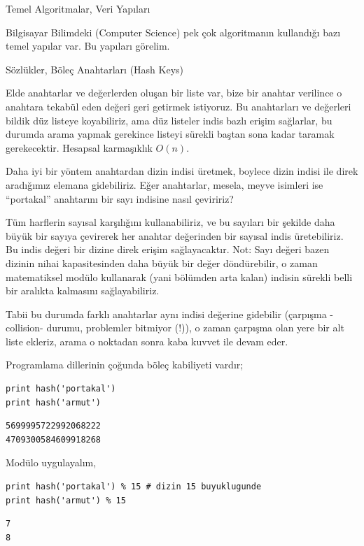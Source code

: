 \documentclass[12pt,fleqn]{article}\usepackage{../../common}
\begin{document}
Temel Algoritmalar, Veri Yapıları

Bilgisayar Bilimdeki (Computer Science) pek çok algoritmanın kullandığı
bazı temel yapılar var. Bu yapıları görelim. 

Sözlükler, Böleç Anahtarları (Hash Keys)

Elde anahtarlar ve değerlerden oluşan bir liste var, bize bir anahtar
verilince o anahtara tekabül eden değeri geri getirmek istiyoruz. Bu
anahtarları ve değerleri bildik düz listeye koyabiliriz, ama düz listeler
indis bazlı erişim sağlarlar, bu durumda arama yapmak gerekince listeyi
sürekli baştan sona kadar taramak gerekecektir. Hesapsal karmaşıklık
$O(n)$.

Daha iyi bir yöntem anahtardan dizin indisi üretmek, boylece dizin indisi
ile direk aradığımız elemana gidebiliriz. Eğer anahtarlar, mesela, meyve
isimleri ise ``portakal'' anahtarını bir sayı indisine nasıl çeviririz?

Tüm harflerin sayısal karşılığını kullanabiliriz, ve bu sayıları bir
şekilde daha büyük bir sayıya çevirerek her anahtar değerinden bir sayısal
indis üretebiliriz. Bu indis değeri bir dizine direk erişim
sağlayacaktır. Not: Sayı değeri bazen dizinin nihai kapasitesinden daha
büyük bir değer döndürebilir, o zaman matematiksel modülo kullanarak (yani
bölümden arta kalan) indisin sürekli belli bir aralıkta kalmasını
sağlayabiliriz. 

Tabii bu durumda farklı anahtarlar aynı indisi değerine gidebilir (çarpışma
-collision- durumu, problemler bitmiyor (!)), o zaman çarpışma olan yere
bir alt liste ekleriz, arama o noktadan sonra kaba kuvvet ile devam eder.

Programlama dillerinin çoğunda böleç kabiliyeti vardır;

\begin{verbatim}
print hash('portakal')
print hash('armut')
\end{verbatim}

\begin{verbatim}
5699995722992068222
4709300584609918268
\end{verbatim}

Modülo uygulayalım, 

\begin{verbatim}
print hash('portakal') % 15 # dizin 15 buyuklugunde 
print hash('armut') % 15
\end{verbatim}

\begin{verbatim}
7
8
\end{verbatim}
\end{document}
